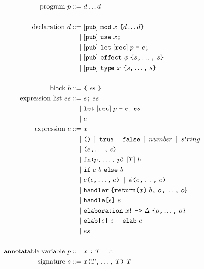 \begin{figure}[p]
\begin{align*}
    \text{program}\ p
        \IS & d \dots d\\
    \\
    \text{declaration}\ d
        \IS & \opt{\tok{pub}}\ \tok{mod}\ x\ \tok{\{} \rep{d} \tok{\}}\\
        \OR & \opt{\tok{pub}}\ \tok{use}\ x\tok{;}\\
        \OR & \opt{\tok{pub}}\ \tok{let}\ \opt{\tok{rec}}\ p\ \tok{=}\ e\tok{;}\\
        \OR & \opt{\tok{pub}}\ \tok{effect}\ \phi\ \tok{\{} \csep{s} \tok{\}}\\
        \OR & \opt{\tok{pub}}\ \tok{type}\ x\ \tok{\{} \csep{s} \tok{\}}\\
    \\
    \text{block}\ b
        \IS & \tok{\{}\ es\ \tok{\}}\\
    \text{expression list}\ es
        \IS & e\tok{;}\ es\\
        \OR & \tok{let}\ \opt{\tok{rec}}\ p\ \tok{=}\ e\tok{;}\ es\\
        \OR & e\\
    \text{expression}\ e
        \IS & x\\
        \OR & \tok{()} \OR \tok{true} \OR \tok{false} \OR number \OR string \\
        \OR & \tok{(} \csep{e} \tok{)} \\
        \OR & \tok{fn} \tok{(} \csep{p} \kw{)}\ [T]\ b \\
        \OR & \tok{if}\ e\ b\ \tok{else}\ b\\
        \OR & e\tok{(} \csep{e} \tok{)} \OR \phi\tok{(} \csep{e} \tok{)} \\
        \OR & \tok{handler}\ \tok{\{} \tok{return} \tok{(}x\tok{)}\ b \tok{,}\ \csep{o} \tok{\}}\\
        \OR & \tok{handle}\tok{[}e\tok{]}\ e \\
        \OR & \tok{elaboration}\ x\tok{!}\ \tok{->}\ \Delta\ \tok{\{} \csep{o} \tok{\}}\\
        \OR & \tok{elab}\tok{[} e \tok{]}\ e \OR \tok{elab}\ e \\
        \OR & es\\
    \\
    \text{annotatable variable}\ p
        \IS & x\ \tok{:}\ T \OR x\\
    \text{signature}\ s
        \IS & x \tok{(} \csep{T} \tok{)}\ T\\

\end{align*}
\end{figure}
